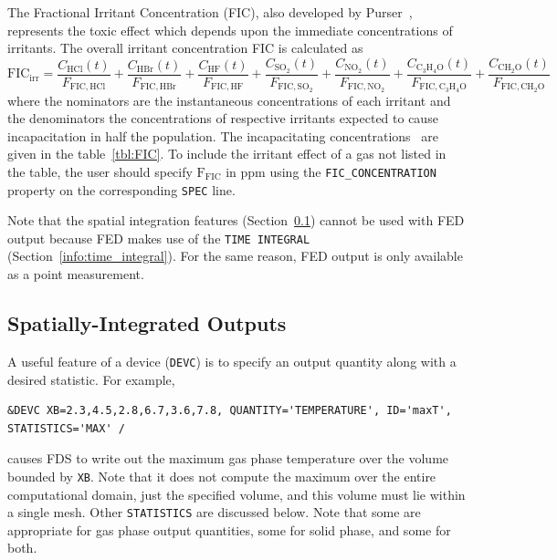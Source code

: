 \documentclass[11pt]{book}
\newcommand{\ct}{\tt\small}
\newcommand{\be}{\begin{equation}}
\newcommand{\ee}{\end{equation}}
\begin{document}
The Fractional Irritant Concentration (FIC), also developed by Purser~\cite{SFPE:Purser}, represents the toxic effect which
depends upon the immediate concentrations of irritants. The overall irritant concentration FIC is calculated as
\be
\mathrm{FIC}_\mathrm{irr} =
    \frac{C_\mathrm{HCl}(t)}    {F_\mathrm{FIC,HCl}} +
    \frac{C_\mathrm{HBr}(t)}    {F_\mathrm{FIC,HBr}} +
    \frac{C_\mathrm{HF}(t)}     {F_\mathrm{FIC,HF}} +
    \frac{C_\mathrm{SO_2}(t)}   {F_\mathrm{FIC,SO_2}} +
    \frac{C_\mathrm{NO_2}(t)}   {F_\mathrm{FIC,NO_2}} +
    \frac{C_\mathrm{C_3H_4O}(t)}{F_\mathrm{FIC,C_3H_4O}} +
    \frac{C_\mathrm{CH_2O}(t)}  {F_\mathrm{FIC,CH_2O}}
\ee
where the nominators are the instantaneous concentrations of each irritant and the denominators the concentrations of respective irritants
expected to cause incapacitation in half the population. The incapacitating concentrations~\cite{SFPE:Purser} are given in the table~\ref{tbl:FIC}.
To include the irritant effect of a gas not listed in the table, the user should specify $\mathrm{F_{FIC}}$ in ppm using the {\ct FIC\_CONCENTRATION}
property on the corresponding {\ct SPEC} line.

Note that the spatial integration features (Section~\ref{info:statistics}) cannot be used with FED output because FED makes
use of the {\ct TIME INTEGRAL} (Section~\ref{info:time_integral}). For the same reason, FED output is only available as a point
measurement.

\subsection{Spatially-Integrated Outputs}
\label{info:statistics}

A useful feature of a device ({\ct DEVC}) is to specify an output quantity along with a desired statistic. For example,

\footnotesize
\begin{verbatim}
&DEVC XB=2.3,4.5,2.8,6.7,3.6,7.8, QUANTITY='TEMPERATURE', ID='maxT', STATISTICS='MAX' /
\end{verbatim}
\normalsize

\noindent
causes FDS to write out the maximum gas phase temperature over the volume bounded by {\ct XB}. Note that it
does not compute the maximum over the entire computational domain, just the specified volume, and this volume must lie within a single mesh.
Other {\ct STATISTICS} are discussed below.  Note that some are appropriate for gas phase output quantities, some for solid phase,
and some for both.
\end{document}
